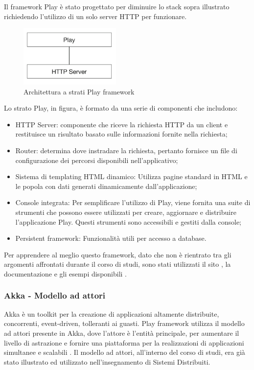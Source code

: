 Il framework Play è stato progettato per diminuire lo stack sopra illustrato richiedendo l'utilizzo di un solo server HTTP per funzionare.

\begin{figure}[H]
\centering
\includegraphics[width=5cm]{figures/Play_layered_architecture.png}
\caption{Architettura a strati Play framework\cite{play_framework_book}}
\end{figure}

Lo strato Play, in figura, è formato da una serie di componenti che includono:
\begin{itemize}
    \item HTTP Server: componente che riceve la richiesta HTTP da un client e restituisce un risultato basato sulle informazioni fornite nella richiesta;
    \item Router: determina dove instradare la richiesta, pertanto fornisce un file di configurazione dei percorsi disponibili nell'applicativo;
    \item Sistema di templating HTML dinamico: Utilizza pagine standard in HTML e le popola con dati generati dinamicamente dall'applicazione;
    \item Console integrata: Per semplificare l'utilizzo di Play, viene fornita una suite di strumenti che possono essere utilizzati per creare, aggiornare e distribuire l'applicazione Play. Questi strumenti sono accessibili e gestiti dalla console;
    \item Persistent framework: Funzionalità utili per accesso a database.
\end{itemize}

Per apprendere al meglio questo framework, dato che non è rientrato tra gli argomenti affrontati durante il corso di studi, sono stati utilizzati il sito \cite{play-framework}, la documentazione \cite{play-framework-documentation} e gli esempi disponibili \cite{play-framework-example}.

\subsubsection*{Akka - Modello ad attori}

Akka è un toolkit per la creazione di applicazioni altamente distribuite, concorrenti, event-driven, tolleranti ai guasti. Play framework utilizza il modello ad attori presente in Akka, dove l'attore è l'entità principale, per aumentare il livello di astrazione e fornire una piattaforma per la realizzazioni di applicazioni simultanee e scalabili \cite{akka}.  Il modello ad attori, all’interno del corso di studi, era già stato illustrato ed utilizzato nell'insegnamento di Sistemi Distribuiti. 

